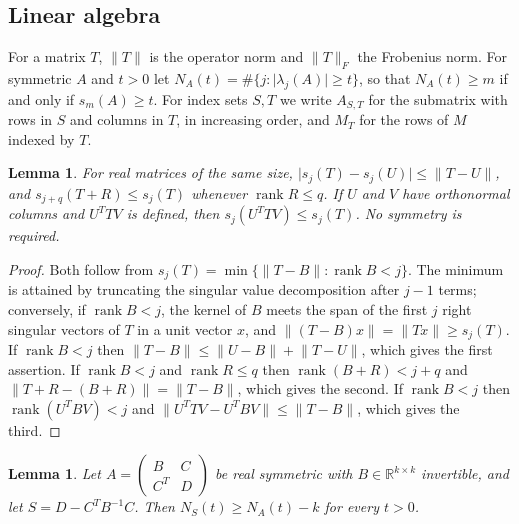 \documentclass[11pt]{amsart}
\numberwithin{equation}{section}
\newtheorem{lemma}[theorem]{Lemma}
\theoremstyle{definition}
\theoremstyle{remark}
\newcommand{\R}{\mathbb R}
\newcommand{\1}{\mathbf 1}
\DeclareMathOperator{\rank}{rank}
\newcommand{\norm}[1]{\lVert #1\rVert}
\newcommand{\abs}[1]{\lvert #1\rvert}
\begin{document}
\subsection{Linear algebra}
For a matrix $T$, $\norm T$ is the operator norm and $\norm T_F$ the Frobenius norm. For symmetric $A$ and $t>0$ let $N_A(t)=\#\{j:\abs{\lambda_j(A)}\ge t\}$, so that $N_A(t)\ge m$ if and only if $s_m(A)\ge t$. For index sets $S,T$ we write $A_{S,T}$ for the submatrix with rows in $S$ and columns in $T$, in increasing order, and $M_T$ for the rows of $M$ indexed by $T$.

\begin{lemma}\label{lem:weyl}
For real matrices of the same size, $\abs{s_j(T)-s_j(U)}\le\norm{T-U}$, and $s_{j+q}(T+R)\le s_j(T)$ whenever $\rank R\le q$. If $U$ and $V$ have orthonormal columns and $U^TTV$ is defined, then $s_j(U^TTV)\le s_j(T)$. No symmetry is required.
\end{lemma}

\begin{proof}
Both follow from $s_j(T)=\min\{\norm{T-B}:\rank B<j\}$. The minimum is attained by truncating the singular value decomposition after $j-1$ terms; conversely, if $\rank B<j$, the kernel of $B$ meets the span of the first $j$ right singular vectors of $T$ in a unit vector $x$, and $\norm{(T-B)x}=\norm{Tx}\ge s_j(T)$. If $\rank B<j$ then $\norm{T-B}\le\norm{U-B}+\norm{T-U}$, which gives the first assertion. If $\rank B<j$ and $\rank R\le q$ then $\rank(B+R)<j+q$ and $\norm{T+R-(B+R)}=\norm{T-B}$, which gives the second. If $\rank B<j$ then $\rank(U^TBV)<j$ and $\norm{U^TTV-U^TBV}\le\norm{T-B}$, which gives the third.
\end{proof}

\begin{lemma}\label{lem:schur}
Let $A=\begin{pmatrix}B&C\\C^T&D\end{pmatrix}$ be real symmetric with $B\in\R^{k\times k}$ invertible, and let $S=D-C^TB^{-1}C$. Then $N_S(t)\ge N_A(t)-k$ for every $t>0$.
\end{lemma}
\end{document}
